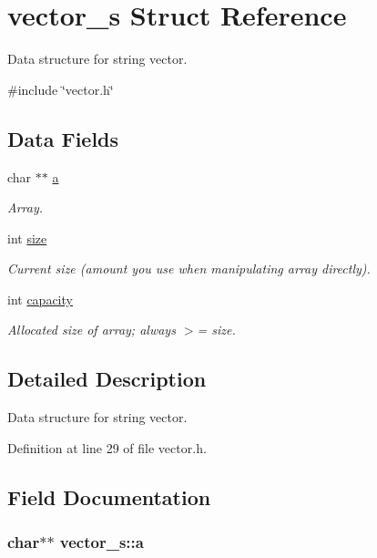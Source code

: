 \hypertarget{structvector__s}{\section{vector\-\_\-s \-Struct \-Reference}
\label{structvector__s}
}


\-Data structure for string vector.  




{\ttfamily \#include \char`\"{}vector.\-h\char`\"{}}

\subsection*{\-Data \-Fields}
\begin{DoxyCompactItemize}
\item 
char $\ast$$\ast$ \hyperlink{structvector__s_a106b319236f6163ae3ae4ae132221607}{a}
\begin{DoxyCompactList}\small\item\em \-Array. \end{DoxyCompactList}\item 
int \hyperlink{structvector__s_a817205845ca0191af990f05b62e587b9}{size}
\begin{DoxyCompactList}\small\item\em \-Current size (amount you use when manipulating array directly). \end{DoxyCompactList}\item 
int \hyperlink{structvector__s_a8db5892656cbc148d5bf3b8fcb144df9}{capacity}
\begin{DoxyCompactList}\small\item\em \-Allocated size of array; always $>$= size. \end{DoxyCompactList}\end{DoxyCompactItemize}


\subsection{\-Detailed \-Description}
\-Data structure for string vector. 



\-Definition at line 29 of file vector.\-h.



\subsection{\-Field \-Documentation}
\hypertarget{structvector__s_a106b319236f6163ae3ae4ae132221607}{
\subsubsection[{a}]{\setlength{\rightskip}{0pt plus 5cm}char$\ast$$\ast$ {\bf vector\-\_\-s\-::a}}}\label{structvector__s_a106b319236f6163ae3ae4ae132221607}


